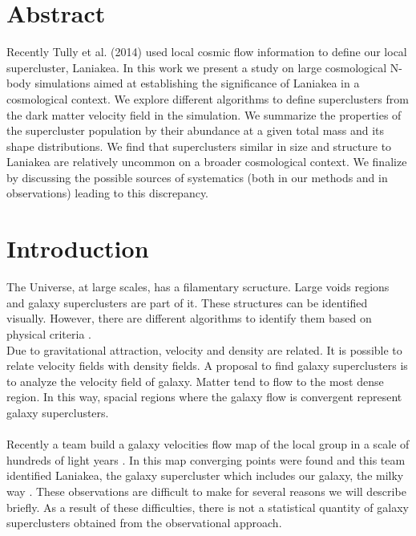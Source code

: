 \documentclass[12pt]{article}
\begin{document}
\section{Abstract}
Recently Tully et al. (2014)
 \cite{tully_laniakea_2014} used local cosmic flow
 information to define our local supercluster,
  Laniakea. 
In this work we present a study on large
 cosmological N-body
simulations aimed at establishing the significance
 of Laniakea in a
cosmological context.
We explore different algorithms to define
 superclusters from the dark
matter velocity field in the simulation. 
We summarize the properties of the supercluster
 population by their
abundance at a given total mass and its shape
 distributions.
We find that superclusters similar in size and
 structure to Laniakea are
relatively uncommon on a broader cosmological
 context.
We finalize by discussing the possible sources of
 systematics (both in
our methods and in observations) leading to this
 discrepancy.
\newpage
\tableofcontents
\newpage

\section{Introduction}
The Universe, at large scales, has a filamentary
 scructure. Large voids regions and galaxy
  superclusters are part of it. These structures can
   be identified visually. However, there are
    different algorithms to identify them based on
     physical criteria \cite{gott_iii_map_2005}.    
\\

Due to gravitational attraction, velocity and
 density are related. It is possible to relate
  velocity fields with density fields. A proposal to
   find galaxy superclusters is to analyze the
    velocity field of galaxy. Matter tend to flow to
     the most dense region. In this way, spacial
      regions where the galaxy flow is convergent
       represent galaxy superclusters.\\
\\
Recently a team build a galaxy velocities flow map
 of the local group in a scale of hundreds of light
  years \cite{tully_cosmicflows-2_2013}. In this map
   converging points were found and this team
    identified Laniakea, the galaxy supercluster
     which includes our galaxy, the milky way
      \cite{tully_laniakea_2014}. These observations
       are difficult to make for several reasons we
        will describe briefly. As a result of these
         difficulties, there is not a statistical
          quantity of galaxy superclusters obtained
           from the observational approach. 
\\   
\end{document}
